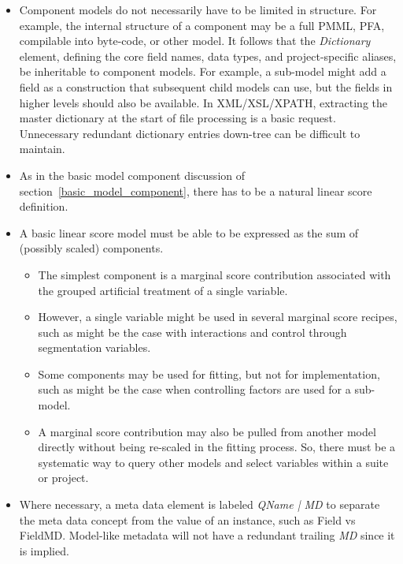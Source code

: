 \documentclass[10pt]{article}
\begin{document}
\begin{itemize}[label=-,noitemsep,topsep=0pt]
    \item Component models do not necessarily have to be limited in structure.  For example, the internal structure of a 
        component may be a full PMML, PFA, compilable into byte-code, or other model.  It follows that the {\em Dictionary} element, defining
        the core field names, data types, and project-specific aliases, be inheritable to component models.  For example,
        a sub-model might add a field as a construction that subsequent child models can use, but the fields in higher 
        levels should also be available.  In XML/XSL/XPATH, extracting the master dictionary at the start of file processing
        is a basic request.  Unnecessary redundant dictionary entries down-tree can be difficult to maintain.

    \item As in the basic model component discussion of section~\ref{basic_model_component}, there has to be a natural
        linear score definition.

    \item A basic linear score model must be able to be expressed as the sum of (possibly scaled) components.  
        \begin{itemize} 
            \item The simplest component is a marginal score contribution associated with the grouped artificial treatment of a single variable.
            \item However, a single variable might be used in several marginal score recipes, such as might be the case with interactions and
        control through segmentation variables.
            \item Some components may be used for fitting, but not for implementation, such as might be the case 
                when controlling factors are used for a sub-model.
            \item A marginal score contribution may also be pulled from another model directly without being re-scaled in the fitting
                process.  So, there must be a systematic way to query other models and select variables within a suite or project.
        \end{itemize}

    \item Where necessary, a meta data element is labeled {\em QName | MD} to 
                separate the meta data concept from the value of an instance, such as Field vs FieldMD.
                Model-like metadata will not have a redundant trailing {\em MD} since it is implied.


\end{itemize}
\end{document}
